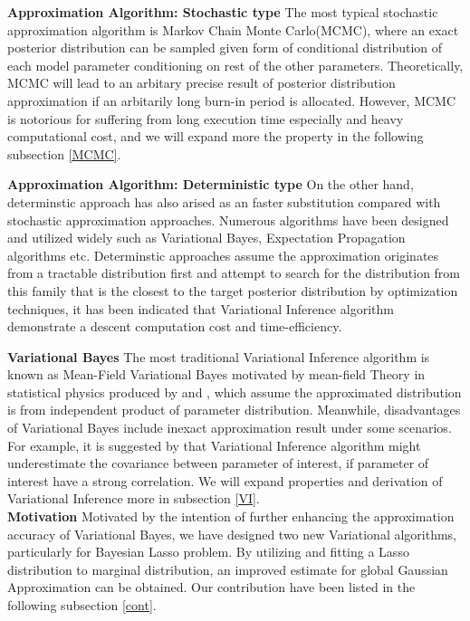 \textbf{Approximation Algorithm: Stochastic type}
The most typical stochastic approximation algorithm is Markov Chain Monte Carlo(MCMC), where an exact posterior distribution can be sampled given form of conditional distribution of each model parameter conditioning on rest of the other parameters. Theoretically, MCMC will lead to an arbitary precise result of posterior distribution approximation if an arbitarily long burn-in period is allocated. However, MCMC is notorious for suffering from long execution time especially and heavy computational cost, and we will expand more the property in the following subsection \ref{MCMC}.

\textbf{Approximation Algorithm: Deterministic type}
On the other hand, determinstic approach has also arised as an faster substitution compared with stochastic approximation approaches. Numerous algorithms have been designed and utilized widely such as Variational Bayes, Expectation Propagation algorithms etc. Determinstic approaches assume the approximation originates from a tractable distribution first and attempt to search for the distribution from this family that is the closest to the target posterior distribution by optimization techniques, it has been indicated that Variational Inference algorithm demonstrate a descent computation cost and time-efficiency. 

\textbf{Variational Bayes}
The most traditional Variational Inference algorithm is known as Mean-Field Variational Bayes motivated by mean-field Theory in statistical physics produced by 
\cite{jordan_ghahramani_jaakkola_saul_1998} and \cite{attias_1999}, which assume the approximated distribution is from independent product of parameter distribution.
Meanwhile, disadvantages of Variational Bayes include inexact approximation result under some scenarios. For example, it is suggested by \cite{Bishop_2006} that Variational Inference algorithm might underestimate the covariance between parameter of interest, if parameter of interest have a strong correlation. We will expand properties and derivation of Variational Inference more in subsection \ref{VI}.\\

\textbf{Motivation}
Motivated by the intention of further enhancing the approximation accuracy of Variational Bayes, we have designed two new Variational algorithms, particularly for Bayesian Lasso problem. By utilizing and fitting a Lasso distribution to marginal distribution, an improved estimate for global Gaussian Approximation can be obtained. Our contribution have been listed in the following subsection \ref{cont}.\\


